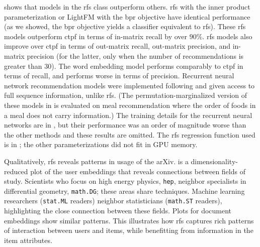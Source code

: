  shows that models in the \gls{rfs} class outperform others. \gls{rfs} with the inner product parameterization or LightFM with the \gls{bpr} objective have identical performance (as we showed, the \gls{bpr} objective yields a classifier equivalent to \gls{rfs}).  These \gls{rfs} models outperform \gls{ctpf} in terms of in-matrix recall by over $90\%$. \gls{rfs} models also improve over \gls{ctpf} in terms of out-matrix recall, out-matrix precision, and in-matrix precision (for the latter, only when the number of recommendations is greater than $30$). The word embedding model performs comparably to \gls{ctpf} in terms of recall, and performs worse in terms of precision. Recurrent neural network recommendation models were implemented following \citet{bansal2016ask-the-gru:} and given access to full sequence information, unlike \gls{rfs}. (The permutation-marginalized version of these models in  is evaluated on meal recommendation where the order of foods in a meal does not carry information.) The training details for the recurrent neural networks are in , but their performance was an order of magnitude worse than the other methods and these results are omitted. The \gls{rfs} regression function used is in ; the other parameterizations did not fit in GPU memory.

Qualitatively, \gls{rfs} reveals patterns in usage of the arXiv.  is a dimensionality-reduced plot of the user embeddings that reveals connections between fields of study. Scientists who focus on high energy physics, \texttt{hep}, neighbor specialists in differential geometry, \texttt{math.DG}; these areas share techniques. Machine learning researchers (\texttt{stat.ML} readers) neighbor statisticians (\texttt{math.ST} readers), highlighting the close connection between these fields. Plots for document embeddings show similar patterns. This illustrates how \gls{rfs} captures rich patterns of interaction between users and items, while benefitting from information in the item attributes.

